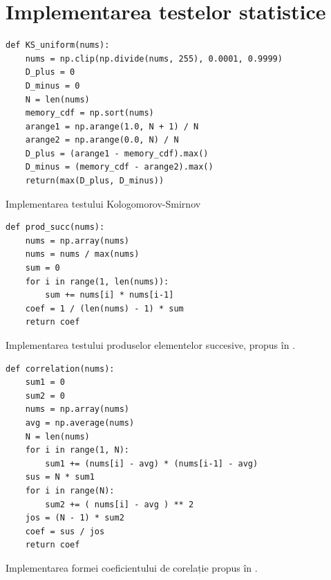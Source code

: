 \newpage

\section{Implementarea testelor statistice}
\label{anexa3:TesteStatistice}
\begin{code}
\begin{verbatim}
def KS_uniform(nums):
    nums = np.clip(np.divide(nums, 255), 0.0001, 0.9999)
    D_plus = 0
    D_minus = 0
    N = len(nums)
    memory_cdf = np.sort(nums)
    arange1 = np.arange(1.0, N + 1) / N
    arange2 = np.arange(0.0, N) / N
    D_plus = (arange1 - memory_cdf).max()
    D_minus = (memory_cdf - arange2).max()
    return(max(D_plus, D_minus))
\end{verbatim}
\caption{Implementarea testului Kologomorov-Smirnov}
\end{code}

\begin{code}
\begin{verbatim}
def prod_succ(nums):
    nums = np.array(nums)
    nums = nums / max(nums)
    sum = 0
    for i in range(1, len(nums)):
        sum += nums[i] * nums[i-1]
    coef = 1 / (len(nums) - 1) * sum
    return coef
\end{verbatim}
\caption{Implementarea testului produselor elementelor succesive, propus în \cite{art:PetrilaMantaUnguranu:IEEESystheory:2014}.}
\end{code}

\begin{code}
\begin{verbatim}
def correlation(nums):
    sum1 = 0
    sum2 = 0
    nums = np.array(nums)
    avg = np.average(nums)
    N = len(nums)
    for i in range(1, N):
        sum1 += (nums[i] - avg) * (nums[i-1] - avg)
    sus = N * sum1
    for i in range(N):
        sum2 += ( nums[i] - avg ) ** 2
    jos = (N - 1) * sum2
    coef = sus / jos
    return coef
\end{verbatim}
\caption{Implementarea formei coeficientului de corelație propus în \cite{art:PetrilaMantaUnguranu:IEEESystheory:2014}.}
\end{code}

